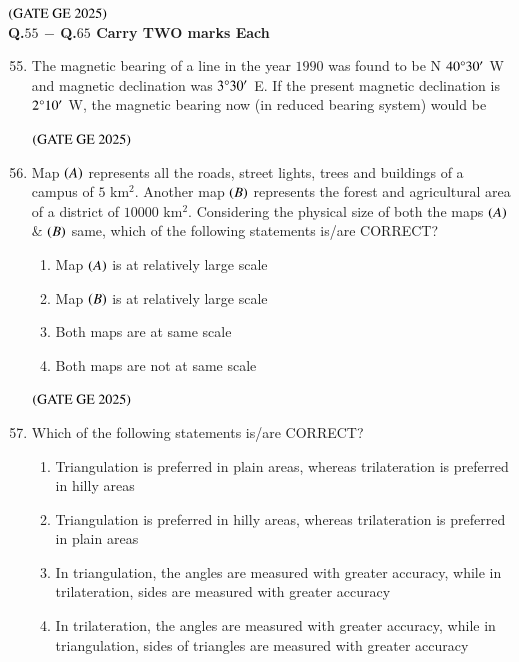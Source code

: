 \documentclass[journal,12pt,onecolumn]{IEEEtran}
\theoremstyle{remark}
\begin{document}
\hfill $\left(\text{GATE GE 2025}\right)$
\bigskip
\\
\textbf{Q.$55$ $-$ Q.$65$ Carry TWO marks 
Each}\\
\begin{enumerate}
\setcounter{enumi}{54}
\item The magnetic bearing of a line in the year $1990$ was found to be N $40\degree30'$ W and magnetic declination was $3\degree30'$ E. If the present magnetic declination is $2\degree10'$ W, the magnetic bearing now (in reduced bearing system) would be
\begin{enumerate}
\end{enumerate}
\hfill $\left(\text{GATE GE 2025}\right)$
\bigskip
\item Map $\left(A\right)$ represents all the roads, street lights, trees and buildings of a campus of $5$ km$^2$.
Another map $\left(B\right)$ represents the forest and agricultural area of a district of $10000$ km$^2$.
Considering the physical size of both the maps $\left(A\right)$ \& $\left(B\right)$ same, which of the following statements is/are CORRECT?
\begin{enumerate}
\item Map $\left(A\right)$ is at relatively large scale
\item Map $\left(B\right)$ is at relatively large scale
\item Both maps are at same scale
\item Both maps are not at same scale
\end{enumerate}
\hfill $\left(\text{GATE GE 2025}\right)$
\bigskip
\item Which of the following statements is/are CORRECT?
\begin{enumerate}
\item Triangulation is preferred in plain areas, whereas trilateration is preferred in hilly areas
\item Triangulation is preferred in hilly areas, whereas trilateration is preferred in plain areas
\item In triangulation, the angles are measured with greater accuracy, while in trilateration, sides are measured with greater accuracy
\item In trilateration, the angles are measured with greater accuracy, while in triangulation, sides of triangles are measured with greater accuracy

\end{enumerate}
\end{enumerate}
\end{document}
